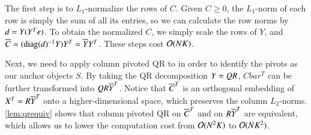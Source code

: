 The first step is to $L_1$\hyp{}normalize the rows of $C$. Given $C \geq 0$, 
the $L_1$\hyp{}norm of each row is simply the sum of all its entries, so we can
calculate the row norms by $d \mathrel{=} Y(Y^Te)$. To obtain the normalized $C$, we
simply scale the rows of $Y$, and $\overline{C} \mathrel{=} (\operatorname{diag}(d)^{-1}Y)Y^T \mathrel{=} \overline{Y} 
Y^T$. These steps cost $\mathcal{O}(NK)$.

Next, we need to apply column pivoted QR to  in order to
identify the pivots as our anchor objects $S$. By taking the QR decomposition
$Y \mathrel{=} QR$, $Cbar^T$ can be further transformed into $QR\overline{Y}^T$. Notice that
$\overline{C}^T$ is an orthogonal embedding of $X^T = R\overline{Y}^T$ onto a
higher\hyp{}dimensional space, which preserves the column $L_2$\hyp{}norms.
\cref{lem:qrequiv} shows that column pivoted QR on $\overline{C}^T$ and on $R\overline{Y}^T$
are equivalent, which allows us to lower the computation cost from $\mathcal{O}(N^2K)$
to $\mathcal{O}(NK^2)$.

